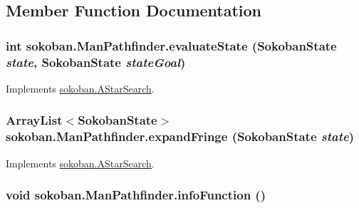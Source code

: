 \subsection{Member Function Documentation}
\hypertarget{classsokoban_1_1ManPathfinder_62decfb98167d1f63ea33408c5130e00}{
\subsubsection[{evaluateState}]{\setlength{\rightskip}{0pt plus 5cm}int sokoban.ManPathfinder.evaluateState ({\bf SokobanState} {\em state}, \/  {\bf SokobanState} {\em stateGoal})}}
\label{classsokoban_1_1ManPathfinder_62decfb98167d1f63ea33408c5130e00}




Implements \hyperlink{classsokoban_1_1AStarSearch_7f5d111fd7504dc6d47dece202a26b6e}{sokoban.AStarSearch}.\hypertarget{classsokoban_1_1ManPathfinder_096cfcfa1b5506db10dc160810ffca49}{
\subsubsection[{expandFringe}]{\setlength{\rightskip}{0pt plus 5cm}ArrayList$<${\bf SokobanState}$>$ sokoban.ManPathfinder.expandFringe ({\bf SokobanState} {\em state})}}
\label{classsokoban_1_1ManPathfinder_096cfcfa1b5506db10dc160810ffca49}




Implements \hyperlink{classsokoban_1_1AStarSearch_d898d53b9ed79238fca960bf6f453b7e}{sokoban.AStarSearch}.\hypertarget{classsokoban_1_1ManPathfinder_d1511ea4db735c0143acfd91352014d8}{
\subsubsection[{infoFunction}]{\setlength{\rightskip}{0pt plus 5cm}void sokoban.ManPathfinder.infoFunction ()}}
\label{classsokoban_1_1ManPathfinder_d1511ea4db735c0143acfd91352014d8}




